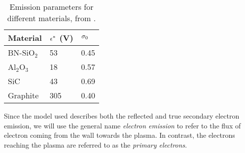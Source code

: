  \begin{table}[hbt]
   \centering
   \caption{Emission parameters for different materials, from \citet{barral2003a}.}
   \label{tab-seeparames}
   \begin{tabular}{@{}lll@{}} \toprule
   Material & $\epsilon^{*}$ (V)& $\sigma _0$ \\ \midrule
   BN-SiO$_2$ & 53 & 0.45 \\ 
   Al$_2$O$_3$ & 18  & 0.57 \\ 
   SiC     &  43  &0.69  \\
   Graphite & 305  & 0.40 \\ 
   \bottomrule
   \end{tabular}
 \end{table}
 
 Since the model used describes both the reflected and true secondary electron emission, we will use the general name \emph{electron emission}  to refer to the flux of electron coming from the wall towards the plasma.
 In contrast, the electrons reaching the plasma are referred to as the \emph{primary electrons}.
